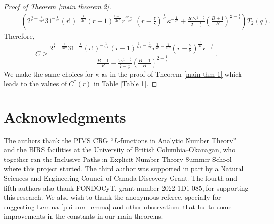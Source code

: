 \documentclass[12pt]{amsart}
\theoremstyle{plain}
\theoremstyle{definition}
\begin{document}
\begin{proof}[Proof of Theorem \ref{main theorem 2}]
\begin{align*}
    &= \left(2^{\frac{4}{r}-\frac{1}{2r^2}}31^{-\frac{1}{2r}}(r!)^{-\frac{1}{2r^2}}(r-1)^{\frac{1-r}{2r^2}}r^{\frac{3r-1}{2r^2}}\left(r-\frac{7}{8}\right)^{\frac{1}{2r}}\kappa^{-\frac{1}{2r}} +\frac{2C\kappa^{1-\frac{1}{r}}}{2-\frac{1}{r}}\left(\frac{B+1}{B}\right)^{2-\frac{1}{r}}\right)T_2(q).
\end{align*}
Therefore,
\begin{equation} \label{C* lower bound}
C \ge \frac{2^{\frac{4}{r}-\frac{1}{2r^2}}31^{-\frac{1}{2r}}(r!)^{-\frac{1}{2r^2}}(r-1)^{\frac{1}{2r^2}-\frac{1}{2r}}r^{\frac{3}{2r}-\frac{1}{2r^2}}\left(r-\frac{7}{8}\right)^{\frac{1}{2r}}\kappa^{-\frac{1}{2r}}}{\frac{B-1}{B}-\frac{2\kappa^{1-\frac{1}{r}}}{2-\frac{1}{r}}\left(\frac{B+1}{B}\right)^{2-\frac{1}{r}}}.
\end{equation}
We make the same choices for $\kappa$ as in the proof of Theorem \ref{main thm 1} which leads to the values of $C^*(r)$ in Table \ref{Table 1}.
\end{proof}



\section*{Acknowledgments}

The authors thank the PIMS CRG ``$L$-functions in Analytic Number Theory'' and the BIRS facilities at the University of British Columbia--Okanagan, who together ran the Inclusive Paths in Explicit Number Theory Summer School where this project started. The third author was supported in part by a Natural Sciences and Engineering Council of Canada Discovery Grant. The fourth and fifth authors also thank FONDOCyT, grant number 2022-1D1-085, for supporting this research. We also wish to thank the anonymous referee, specially for suggesting Lemma \ref{phi sum lemma} and other observations that led to some improvements in the constants in our main theorems.



\end{document}
